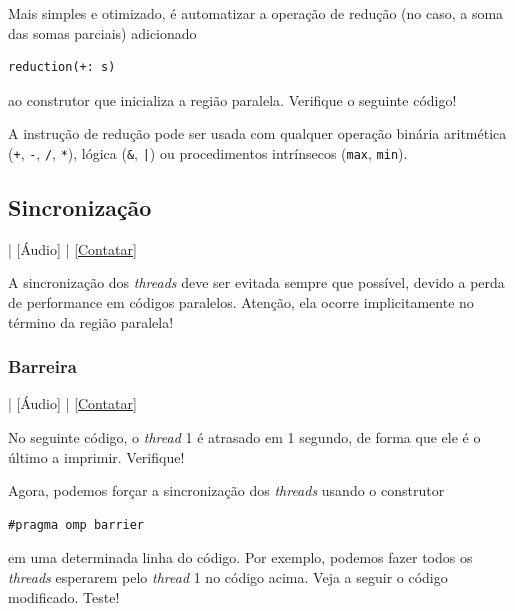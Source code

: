 

Mais simples e otimizado, é automatizar a operação de redução (no caso, a soma das somas parciais) adicionado
\begin{verbatim}
reduction(+: s)
\end{verbatim}
ao construtor que inicializa a região paralela. Verifique o seguinte código!



\begin{obs}
  A instrução de redução pode ser usada com qualquer operação binária aritmética (\verb=+=, \verb=-=, \verb=/=, \verb=*=), lógica (\verb=&=, \verb=|=) ou procedimentos intrínsecos (\verb=max=, \verb=min=).
\end{obs}

\subsection{Sincronização}

\begin{flushright}
  [Vídeo] | [Áudio] | \href{https://phkonzen.github.io/notas/contato.html}{[Contatar]}
\end{flushright}

A sincronização dos {\it threads} deve ser evitada sempre que possível, devido a perda de performance em códigos paralelos. Atenção, ela ocorre implicitamente no término da região paralela!

\subsubsection{Barreira}

\begin{flushright}
  [Vídeo] | [Áudio] | \href{https://phkonzen.github.io/notas/contato.html}{[Contatar]}
\end{flushright}

No seguinte código, o {\it thread} 1 é atrasado em 1 segundo, de forma que ele é o último a imprimir. Verifique!



Agora, podemos forçar a sincronização dos {\it threads} usando o construtor
\begin{verbatim}
#pragma omp barrier
\end{verbatim}
em uma determinada linha do código. Por exemplo, podemos fazer todos os {\it threads} esperarem pelo {\it thread} 1 no código acima. Veja a seguir o código modificado. Teste!

